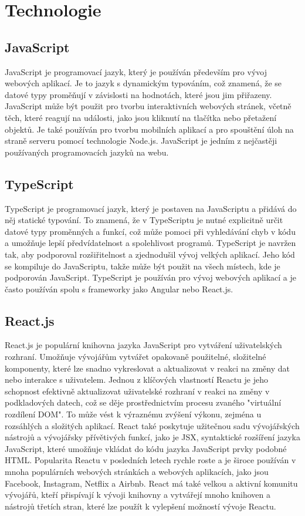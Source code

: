 \section{Technologie}

\subsection{JavaScript}

JavaScript je programovací jazyk, který je používán především pro vývoj webových aplikací. Je to jazyk s dynamickým typováním, což znamená, že se datové typy proměňují v závislosti na hodnotách, které jsou jim přiřazeny. JavaScript může být použit pro tvorbu interaktivních webových stránek, včetně těch, které reagují na události, jako jsou kliknutí na tlačítka nebo přetažení objektů. Je také používán pro tvorbu mobilních aplikací a pro spouštění úloh na straně serveru pomocí technologie Node.js. JavaScript je jedním z nejčastěji používaných programovacích jazyků na webu.

\subsection{TypeScript}
TypeScript je programovací jazyk, který je postaven na JavaScriptu a přidává do něj statické typování. To znamená, že v TypeScriptu je nutné explicitně určit datové typy proměnných a funkcí, což může pomoci při vyhledávání chyb v kódu a umožňuje lepší předvídatelnost a spolehlivost programů. TypeScript je navržen tak, aby podporoval rozšiřitelnost a zjednodušil vývoj velkých aplikací. Jeho kód se kompiluje do JavaScriptu, takže může být použit na všech místech, kde je podporován JavaScript. TypeScript je používán pro vývoj webových aplikací a je často používán spolu s frameworky jako Angular nebo React.js.
\subsection{React.js}\label{reactjs}
React.js je populární knihovna jazyka JavaScript pro vytváření uživatelských rozhraní. Umožňuje vývojářům vytvářet opakovaně použitelné, složitelné komponenty, které lze snadno vykreslovat a aktualizovat v reakci na změny dat nebo interakce s uživatelem. Jednou z klíčových vlastností Reactu je jeho schopnost efektivně aktualizovat uživatelské rozhraní v reakci na změny v podkladových datech, což se děje prostřednictvím procesu zvaného "virtuální rozdílení DOM". To může vést k výraznému zvýšení výkonu, zejména u rozsáhlých a složitých aplikací. React také poskytuje užitečnou sadu vývojářských nástrojů a vývojářsky přívětivých funkcí, jako je JSX, syntaktické rozšíření jazyka JavaScript, které umožňuje vkládat do kódu jazyka JavaScript prvky podobné HTML. Popularita Reactu v posledních letech rychle roste a je široce používán v mnoha populárních webových stránkách a webových aplikacích, jako jsou Facebook, Instagram, Netflix a Airbnb. React má také velkou a aktivní komunitu vývojářů, kteří přispívají k vývoji knihovny a vytvářejí mnoho knihoven a nástrojů třetích stran, které lze použít k vylepšení možností vývoje Reactu.

